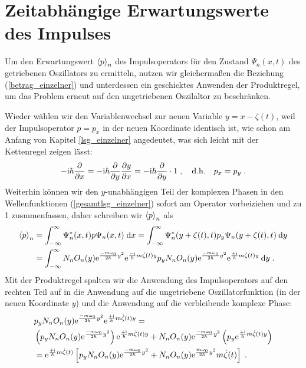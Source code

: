 




  \section{Zeitabhängige Erwartungswerte des Impulses}
    Um den Erwartungswert $\braket{p}_n$ des Impulsoperators für den Zustand $\Psi_n(x,t)$ des getriebenen Oszillators zu ermitteln, nutzen wir gleichermaßen die Beziehung (\ref{betrag_einzelner}) und unterdessen ein geschicktes Anwenden der Produktregel, um das Problem erneut auf den ungetriebenen Oszilaltor zu beschränken.

    Wieder wählen wir den Variablenwechsel zur neuen Variable $y=x-\zeta(t)$, weil der Impulsoperator $p=p_x$ in der neuen Koordinate identisch ist, wie schon am Anfang von Kapitel \ref{lsg_einzelner} angedeutet, was sich leicht mit der Kettenregel zeigen lässt:
    \begin{equation}
      -\text i\hbar \frac{\partial}{\partial x} = -\text i\hbar \frac{\partial}{\partial y}\frac{\partial y}{\partial x} = -\text i\hbar \frac{\partial}{\partial y} \cdot 1 \; , \quad \text{d.h.} \quad p_x = p_y \; .
    \end{equation}
    Weiterhin können wir den $y$-unabhängigen Teil der komplexen Phasen in den Wellenfunktionen (\ref{gesamtlsg_einzelner}) sofort am Operator vorbeiziehen und zu 1 zusmmenfassen, daher schreiben wir $\braket{p}_n$ als
    \begin{align}
      \braket{p}_n &= \int_{-\infty}^{\infty} \Psi^*_n(x,t) p \Psi_n(x,t) \; \text dx
      = \int_{-\infty}^{\infty} \Psi^*_n(y+\zeta(t),t) p_y \Psi_n(y+\zeta(t),t) \: \text dy \notag\\
      &= \int_{-\infty}^{\infty} N_nO_n(y)\text e^{\frac{-m\omega_0}{2\hbar}y^2}\text e^{\frac{-\text i}{\hbar}m\dot{\zeta}(t)y} p_y N_nO_n(y)\text e^{\frac{-m\omega_0}{2\hbar}y^2}\text e^{\frac{+\text i}{\hbar}m\dot{\zeta}(t)y} \: \text dy \; .
      \label{spaste}
    \end{align}
    Mit der Produktregel spalten wir die Anwendung des Impulsoperators auf den rechten Teil auf in die Anwendung auf die ungetriebene Oszillatorfunktion (in der neuen Koordinate $y$) und die Anwendung auf die verbleibende komplexe Phase:
    \begin{align}
      &p_y N_nO_n(y)\text e^{\frac{-m\omega_0}{2\hbar}y^2}\text e^{\frac{+\text i}{\hbar}m\dot{\zeta}(t)y} = \notag\\
      &\left(p_y N_nO_n(y)\text e^{\frac{-m\omega_0}{2\hbar}y^2}\right) \text e^{\frac{+\text i}{\hbar}m\dot{\zeta}(t)y}
      + N_nO_n(y)\text e^{\frac{-m\omega_0}{2\hbar}y^2} \left(p_y \text e^{\frac{+\text i}{\hbar}m\dot{\zeta}(t)y}\right) \notag\\
      &= \text e^{\frac{+\text i}{\hbar}m\dot{\zeta}(t)} \left[p_yN_nO_n(y)\text e^{\frac{-m\omega_0}{2\hbar}y^2} + N_nO_n(y)\text e^{\frac{m\omega_0}{2\hbar}y^2}m\dot{\zeta}(t) \right] \; .
      \label{spaste2}
    \end{align}
